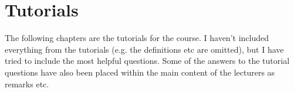 \chapter{Tutorials}

\begin{center}
    The following chapters are the tutorials for the course. I haven't included everything from the tutorials (e.g. the definitions etc are omitted), but I have tried to include the most helpful questions. Some of the answers to the tutorial questions have also been placed within the main content of the lecturers as remarks etc.
\end{center}

















